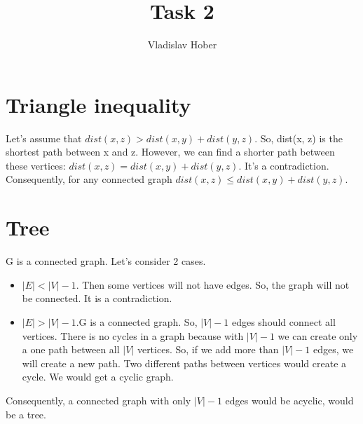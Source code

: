 \documentclass[12pt, letterpaper]{article}
\title{Task 2}
\author{Vladislav Hober}
\date{}
\begin{document}
\maketitle

\section{Triangle inequality}
Let's assume that 
\begin{math}dist(x, z) > dist(x, y) + dist(y, z)\end{math}.
So, dist(x, z) is the shortest path between x and z. However, we can find a shorter path between these vertices:
\begin{math}dist(x, z) = dist(x, y) + dist(y, z)\end{math}.
It's a contradiction. Consequently, for any connected graph
\begin{math}dist(x, z) \leq dist(x, y) + dist(y, z)\end{math}.

\section{Tree}
G is a connected graph. Let's consider 2 cases.
\begin{itemize}
  \item \begin{math} |E| < |V| - 1 \end{math}.\newline
  Then some vertices will not have edges. So, the graph will not be connected. It is a contradiction.
  \item \begin{math} |E| > |V| - 1 \end{math}.\newline G is a connected graph. So, \begin{math}|V|-1\end{math} edges should connect all vertices. There is no cycles in a graph because with \begin{math}|V|-1\end{math}  we can create only a one path between all \begin{math}|V|\end{math} vertices. So, if we add more than \begin{math}|V|-1\end{math} edges, we will create a new path. Two different paths between vertices would create a cycle. We would get a cyclic graph.
\end{itemize}
 Consequently, a connected graph with only \begin{math}|V|-1\end{math} edges would be acyclic, would be a tree.
\end{document}
